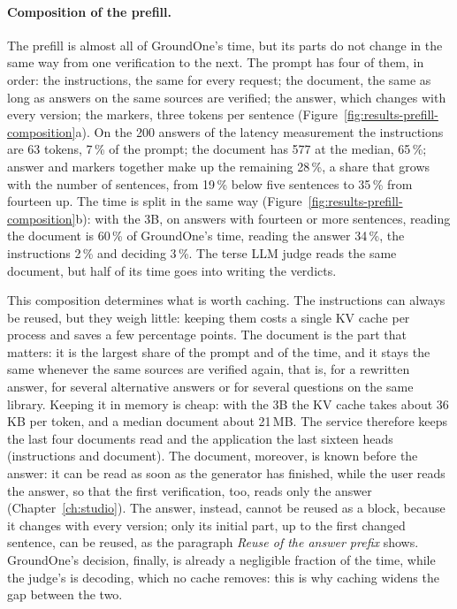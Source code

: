 \paragraph{Composition of the prefill.} The prefill is almost all of GroundOne's time, but its parts do not change in
the same way from one verification to the next. The prompt has four of them, in order: the instructions, the same for
every request; the document, the same as long as answers on the same sources are verified; the answer, which changes with
every version; the markers, three tokens per sentence (Figure~\ref{fig:results-prefill-composition}a). On the 200 answers
of the latency measurement the instructions are 63 tokens, 7\,\% of the prompt; the document has 577 at the median,
65\,\%; answer and markers together make up the remaining 28\,\%, a share that grows with the number of sentences, from
19\,\% below five sentences to 35\,\% from fourteen up. The time is split in the same way
(Figure~\ref{fig:results-prefill-composition}b): with the 3B, on answers with fourteen or more sentences, reading the
document is 60\,\% of GroundOne's time, reading the answer 34\,\%, the instructions 2\,\% and deciding 3\,\%. The terse
LLM judge reads the same document, but half of its time goes into writing the verdicts.

This composition determines what is worth caching. The instructions can always be reused, but they weigh little: keeping
them costs a single KV cache per process and saves a few percentage points. The document is the part that matters: it is
the largest share of the prompt and of the time, and it stays the same whenever the same sources are verified again, that
is, for a rewritten answer, for several alternative answers or for several questions on the same library. Keeping it in
memory is cheap: with the 3B the KV cache takes about 36\,KB per token, and a median document about 21\,MB. The service
therefore keeps the last four documents read and the application the last sixteen heads (instructions and document). The document, moreover, is known before the answer: it can be read as soon as the generator has finished, while the user reads the answer, so that the first verification, too, reads only the answer (Chapter~\ref{ch:studio}). The
answer, instead, cannot be reused as a block, because it changes with every version; only its initial part, up to the
first changed sentence, can be reused, as the paragraph \emph{Reuse of the answer prefix} shows. GroundOne's decision,
finally, is already a negligible fraction of the time, while the judge's is decoding, which no cache removes: this is why
caching widens the gap between the two.

